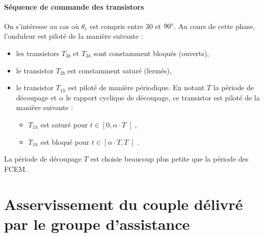 \paragraph{Séquence de commande des transistors} On s'intéresse au cas où $\theta_e$ est compris entre $30$ et $90\degree$. Au cours de cette phase, l'onduleur est piloté de la manière suivante :
\begin{itemize}
 \item les transistors $T_{3b}$ et $T_{3h}$ sont constamment bloqués (ouverts),
 \item le transistor $T_{2b}$ est constamment saturé (fermés),
 \item le transistor $T_{1h}$ est piloté de manière périodique. En notant $T$ la période de découpage et $\alpha$ le rapport cyclique de découpage, ce transistor est piloté de la manière suivante :
 \begin{itemize}
  \item $T_{1h}$ est saturé pour $t\in\left[0,\alpha\cdot T\right[$,
  \item $T_{1h}$ est bloqué pour $t\in\left[\alpha\cdot T,T\right[$.
 \end{itemize}
\end{itemize}

La période de découpage $T$ est choisie beaucoup plus petite que la période des FCEM.



\newpage

\section{Asservissement du couple délivré par le groupe d’assistance}

